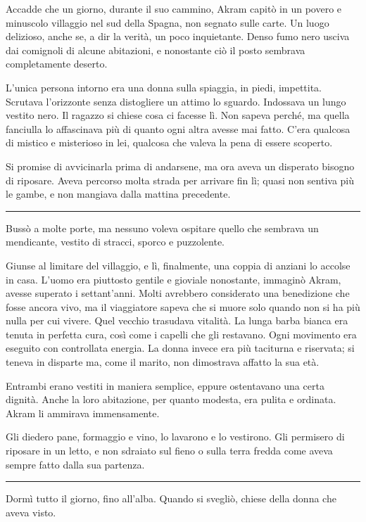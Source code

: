 Accadde che un giorno, durante il suo cammino, Akram capitò in un povero e minuscolo villaggio nel
sud della Spagna, non segnato sulle carte. Un luogo delizioso, anche se, a dir la verità, un poco
inquietante. Denso fumo nero usciva dai comignoli di alcune abitazioni, e nonostante ciò il posto
sembrava completamente deserto.

L'unica persona intorno era una donna sulla spiaggia, in piedi, impettita. Scrutava l'orizzonte
senza distogliere un attimo lo sguardo. Indossava un lungo vestito nero. Il ragazzo si chiese cosa
ci facesse lì. Non sapeva perché, ma quella fanciulla lo affascinava più di quanto ogni altra avesse
mai fatto. C'era qualcosa di mistico e misterioso in lei, qualcosa che valeva la pena di essere
scoperto.

Si promise di avvicinarla prima di andarsene, ma ora aveva un disperato bisogno di riposare. Aveva
percorso molta strada per arrivare fin lì; quasi non sentiva più le gambe, e non mangiava dalla
mattina precedente.

\plainbreak{1}

Bussò a molte porte, ma nessuno voleva ospitare quello che sembrava un mendicante, vestito di
stracci, sporco e puzzolente.

Giunse al limitare del villaggio, e lì, finalmente, una coppia di anziani lo accolse in casa. L'uomo
era piuttosto gentile e gioviale nonostante, immaginò Akram, avesse superato i settant'anni. Molti
avrebbero considerato una benedizione che fosse ancora vivo, ma il viaggiatore sapeva che si muore
solo quando non si ha più nulla per cui vivere. Quel vecchio trasudava vitalità. La lunga barba
bianca era tenuta in perfetta cura, così come i capelli che gli restavano. Ogni movimento era
eseguito con controllata energia. La donna invece era più taciturna e riservata; si teneva in
disparte ma, come il marito, non dimostrava affatto la sua età.

Entrambi erano vestiti in maniera semplice, eppure ostentavano una certa dignità. Anche la loro
abitazione, per quanto modesta, era pulita e ordinata. Akram li ammirava immensamente.

Gli diedero pane, formaggio e vino, lo lavarono e lo vestirono. Gli permisero di riposare in un
letto, e non sdraiato sul fieno o sulla terra fredda come aveva sempre fatto dalla sua partenza.

\plainbreak{1}

Dormì tutto il giorno, fino all'alba. Quando si svegliò, chiese della donna che aveva visto.

